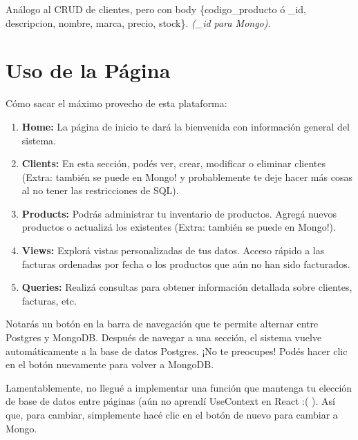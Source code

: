 \documentclass[a4paper,12pt]{article}
\begin{document}
	Análogo al CRUD de clientes, pero con body \{codigo\_producto ó \_id, descripcion, nombre, marca, precio, stock\}.
	\textit{(\_id para Mongo)}.
	
	
	
	
	
	
	
	
	\newpage
	
	\section{Uso de la Página}
	
	Cómo sacar el máximo provecho de esta plataforma:
	
	\begin{enumerate}
		
		\item \textbf{Home:} La página de inicio te dará la bienvenida con información general del sistema.
		
		\item \textbf{Clients:} En esta sección, podés ver, crear, modificar o eliminar clientes (Extra: también se puede en Mongo! y probablemente te deje hacer más cosas al no tener las restricciones de SQL).
		
		\item \textbf{Products:} Podrás administrar tu inventario de productos. Agregá nuevos productos o actualizá los existentes (Extra: también se puede en Mongo!).
		
		\item \textbf{Views:} Explorá vistas personalizadas de tus datos. Acceso rápido a las facturas ordenadas por fecha o los productos que aún no han sido facturados.
		
		\item \textbf{Queries:} Realizá consultas para obtener información detallada sobre clientes, facturas, etc.
		
	\end{enumerate}
	
	Notarás un botón en la barra de navegación que te permite alternar entre Postgres y MongoDB. Después de navegar a una sección, el sistema vuelve automáticamente a la base de datos Postgres. ¡No te preocupes! Podés hacer clic en el botón nuevamente para volver a MongoDB.
	
	\bigskip
	
	Lamentablemente, no llegué a implementar una función que mantenga tu elección de base de datos entre páginas (aún no aprendí UseContext en React :( ). Así que, para cambiar, simplemente hacé clic en el botón de nuevo para cambiar a Mongo.
	
\end{document}
